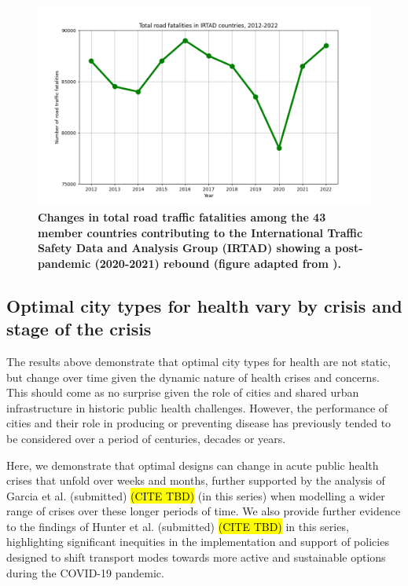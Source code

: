 \documentclass[preprint,10pt]{elsarticle} %
\begin{document}
\begin{figure}
\centering

\includegraphics[trim={0 0 0 0},clip,scale=0.5]{Images/Recreated.png}
\caption{\bf Changes in total road traffic fatalities among the 43 member countries contributing to the International Traffic Safety Data and Analysis Group (IRTAD) showing a post-pandemic (2020-2021) rebound (figure adapted from \cite{ITFRS2023}).}  
 \label{fig:GBD}
\end{figure}



\subsection*{Optimal city types for health vary by crisis and stage of the crisis}

The results above demonstrate that optimal city types for health are not static, but change over time given the dynamic nature of health crises and concerns. This should come as no surprise given the role of cities and shared urban infrastructure in historic public health challenges. However, the performance of cities and their role in producing or preventing disease has previously tended to be considered over a period of centuries, decades or years. 

Here, we demonstrate that optimal designs can change in acute public health crises that unfold over weeks and months, further supported by the analysis of Garcia et al. (submitted) \hl{(CITE TBD)} (in this series) when modelling a wider range of crises over these longer periods of time. We also provide further evidence to the findings of Hunter et al. (submitted) \hl{(CITE TBD)} in this series, highlighting significant inequities in the implementation and support of policies designed to shift transport modes towards more active and sustainable options during the COVID-19 pandemic. 
\end{document}
